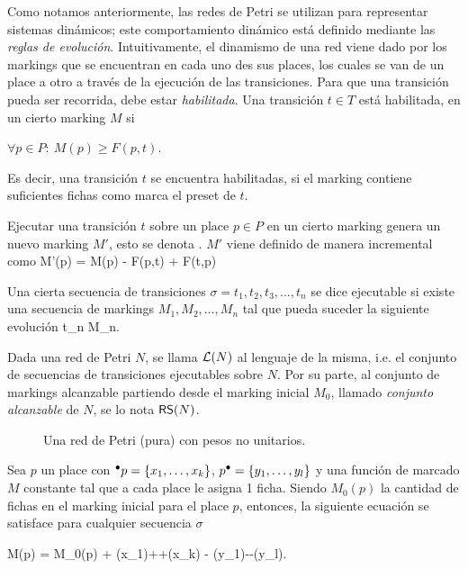 Como notamos anteriormente, las redes de Petri se utilizan para representar sistemas 
dinámicos; este comportamiento dinámico está definido mediante las \emph{reglas de evolución}.
Intuitivamente, el dinamismo de una red viene dado por los markings que se encuentran en cada
uno des sus places, los cuales se van  de un place a otro a través de la 
ejecución de las transiciones. 
Para que una transición pueda ser recorrida, debe estar \emph{habilitada}. Una transición 
$t \in T$ está habilitada, en un cierto marking $M$ si 

\bequation
    \mbox{$\forall p \in P:~ M(p) \ge F(p,t) $}.
\eequation

Es decir, una transición $t$ se encuentra habilitadas, si el marking contiene suficientes
fichas como marca el preset de $t$.

Ejecutar una transición $t$ sobre un place $p \in P$ en un cierto marking genera 
un nuevo marking $M'$, esto se denota .
$M'$ viene definido de manera incremental como
\bequation
    M'(p) = M(p) - F(p,t) +  F(t,p)
\eequation

Una cierta secuencia de transiciones \mbox{$\sigma = t_1,t_2, t_3, \ldots, t_n$}
se dice ejecutable si existe una secuencia de markings \mbox{$M_1, M_2, \ldots, M_n$}
tal que pueda suceder la siguiente evolución
\bequation
     {t_n} {M_n}.
\eequation

Dada una red de Petri $N$, se llama $\mathcal{L}(N)$ al lenguaje de la misma, i.e.
el conjunto de secuencias de transiciones ejecutables sobre $N$.
Por su parte, al conjunto de markings alcanzable partiendo desde el marking inicial $M_0$,
llamado \emph{conjunto alcanzable} de $N$, se lo nota $\textsf{RS}(N)$.

\begin{figure}[h]
  	\centering
    
    \caption{Una red de Petri (pura) con pesos no unitarios.}
    \label{fig:pn1}
\end{figure}

Sea $p$ un place con \mbox{$\mbox{$^\bullet p$}=\{x_1,\ldots,x_k\}$}, \mbox{$\mbox{$p^\bullet$}=\{y_1,\ldots,y_l\}$} 
y una función de marcado $M$ constante  tal que a cada place le asigna 1 ficha.
Siendo $M_0(p)$ la cantidad de fichas en el marking inicial 
para el place $p$, entonces, la siguiente ecuación
se satisface para cualquier secuencia $\sigma$

    M(p) = M_0(p) + \widehat\sigma(x_1)+\cdots +\widehat\sigma(x_k) - \widehat\sigma(y_1)-\cdots -\widehat\sigma(y_l).
\eequation

